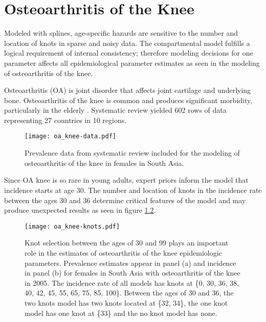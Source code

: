 \chapter{Osteoarthritis of the Knee}
\label{applications-con_fit_splines}

Modeled with splines, age-specific hazards are sensitive to the number and location of knots in sparse and noisy data.  The compartmental model fulfills a logical requirement of internal consistency; therefore modeling decisions for one parameter affects all epidemiological parameter estimates as seen in the modeling of osteoarthritis of the knee.

Osteoarthritis (OA) is joint disorder that affects joint cartilage and underlying bone. Osteoarthritis of the knee is common and produces significant morbidity, particularly in the elderly \cite{felson_epidemiology_1988, felson_incidence_1995}.  Systematic review yielded 602 rows of data representing 27 countries in 10 regions.

    \begin{figure}[h]
        \begin{center}
            \texttt{[image: oa\_knee-data.pdf]}
            \caption{Prevalence data from systematic review included for the modeling of osteoarthritis of the knee in females in South Asia.}
            \label{fig:app-oa knee data}
        \end{center}
    \end{figure}

Since OA knee is so rare in young adults, expert priors inform the model that incidence starts at age 30.  The number and location of knots in the incidence rate between the ages 30 and 36 determine critical features of the model and may produce unexpected results as seen in figure \ref{fig:app-oa knee knots}.

    \begin{figure}[h]
        \begin{center}
            \texttt{[image: oa\_knee-knots.pdf]}
            \caption{Knot selection between the ages of 30 and 99 plays an important role in the estimates of osteoarthritis of the knee epidemiologic parameters.  Prevalence estimates appear in panel (a) and incidence in panel (b) for females in South Asia with osteoarthritis of the knee in 2005.  The incidence rate of all models has knots at \{0, 30, 36, 38, 40, 42, 45, 55, 65, 75, 85, 100\}.  Between the ages of 30 and 36, the two knots model has two knots located at \{32, 34\}, the one knot model has one knot at \{33\} and the no knot model has none.}
            \label{fig:app-oa knee knots}
        \end{center}
    \end{figure}

